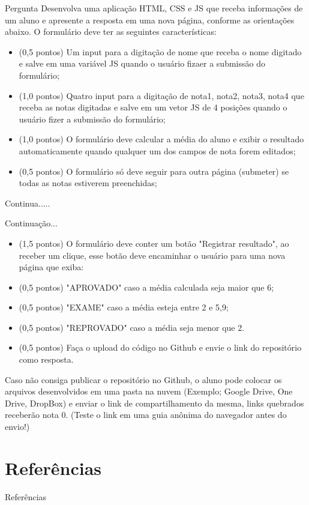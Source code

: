 \documentclass{beamer}
\begin{document}
\begin{frame}{Pergunta}
\small
Desenvolva uma aplicação HTML, CSS e JS que receba informações de um aluno e apresente a resposta em uma nova página, conforme as orientações  abaixo. O formulário deve ter as seguintes características:
    \begin{itemize}
        \item (0,5 pontos) Um input para a digitação de nome que receba o nome digitado e salve em uma variável JS quando o usuário fizaer a submissão do formulário;
        \item (1,0 pontos) Quatro input para a digitação de nota1, nota2, nota3, nota4 que receba as notas digitadas e salve em um vetor JS  de 4 posições quando o usuário fizer a submissão do formulário;
        \item (1,0 pontos)  O formulário deve calcular a média do aluno e exibir o resultado automaticamente quando qualquer um dos campos de nota forem editados;
        \item (0,5 pontos) O formulário só deve seguir para outra página (submeter) se todas as notas estiverem preenchidas;
        
    \end{itemize}
    Continua..... 
\end{frame}
\begin{frame}{Continuação...}
\small
\begin{itemize}
    \item (1,5 pontos) O formulário deve conter um botão "Registrar resultado", ao receber um clique, esse botão deve encaminhar o usuário para uma nova página que exiba:
        \item (0,5 pontos) "APROVADO" caso a média calculada seja maior que 6;
        \item (0,5 pontos) "EXAME" caso a média esteja entre 2 e 5,9;
        \item (0,5 pontos) "REPROVADO" caso a média seja menor que 2.
        \item (0,5 pontos) Faça o upload do código no Github e envie o link do repositório como resposta.
\end{itemize}
Caso não consiga publicar o repositório no Github, o aluno pode colocar os arquivos desenvolvidos em uma pasta na nuvem (Exemplo; Google Drive, One Drive, DropBox) e enviar o link de compartilhamento da mesma, links quebrados receberão nota 0. (Teste o link em uma guia anônima do navegador antes do envio!)
\end{frame}
\section{Referências}

\begin{frame}{Referências}%
\small
\begin{center}
\tiny


\end{center}
\end{frame}
\end{document}
